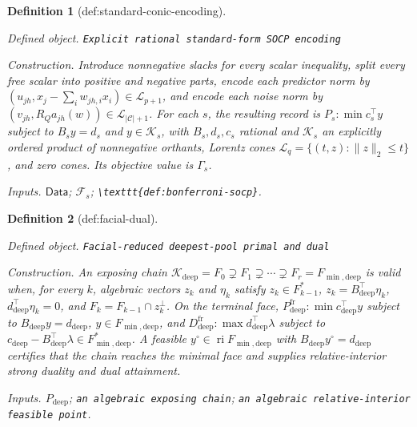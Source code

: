 \documentclass{article}
\newtheorem{definition}{Definition}
\begin{document}
\begin{definition}[def:standard-conic-encoding]\label{def:standard-conic-encoding}
\par\smallskip\noindent\emph{Defined object.} \texttt{Explicit rational standard-\allowbreak{}form SOCP encoding}
\par\smallskip\noindent\emph{Construction.} Introduce nonnegative slacks for every scalar inequality, split every free scalar into positive and negative parts, encode each predictor norm by \((u_{jh},x_j-\sum_iw_{jh,i}x_i)\in\mathcal L_{p+1}\), and encode each noise norm by \((v_{jh},R_Qa_{jh}(w))\in\mathcal L_{|\mathcal C|+1}\). For each \(s\), the resulting record is \(P_s:\min c_s^{\top}y\) subject to \(B_sy=d_s\) and \(y\in\mathcal K_s\), with \(B_s,d_s,c_s\) rational and \(\mathcal K_s\) an explicitly ordered product of nonnegative orthants, Lorentz cones \(\mathcal L_q=\{(t,z):\lVert z\rVert_2\le t\}\), and zero cones. Its objective value is \(\Gamma_s\).
\par\smallskip\noindent\emph{Inputs.} \(\mathsf{Data}\); \(\mathcal F_s\); \texttt{\textbackslash{}\allowbreak{}texttt\{def:\allowbreak{}bonferroni-\allowbreak{}socp\}\allowbreak{}}.
\end{definition}

\begin{definition}[def:facial-dual]\label{def:facial-dual}
\par\smallskip\noindent\emph{Defined object.} \texttt{Facial-\allowbreak{}reduced deepest-\allowbreak{}pool primal and dual}
\par\smallskip\noindent\emph{Construction.} An exposing chain \(\mathcal K_{\mathrm{deep}}=F_0\supsetneq F_1\supsetneq\cdots\supsetneq F_r=F_{\min,\mathrm{deep}}\) is valid when, for every \(k\), algebraic vectors \(z_k\) and \(\eta_k\) satisfy \(z_k\in F_{k-1}^*\), \(z_k=B_{\mathrm{deep}}^{\top}\eta_k\), \(d_{\mathrm{deep}}^{\top}\eta_k=0\), and \(F_k=F_{k-1}\cap z_k^\perp\). On the terminal face, \(P^{\mathrm{fr}}_{\mathrm{deep}}:\min c_{\mathrm{deep}}^{\top}y\) subject to \(B_{\mathrm{deep}}y=d_{\mathrm{deep}}\), \(y\in F_{\min,\mathrm{deep}}\), and \(D^{\mathrm{fr}}_{\mathrm{deep}}:\max d_{\mathrm{deep}}^{\top}\lambda\) subject to \(c_{\mathrm{deep}}-B_{\mathrm{deep}}^{\top}\lambda\in F_{\min,\mathrm{deep}}^*\). A feasible \(y^\circ\in\operatorname{ri}F_{\min,\mathrm{deep}}\) with \(B_{\mathrm{deep}}y^\circ=d_{\mathrm{deep}}\) certifies that the chain reaches the minimal face and supplies relative-interior strong duality and dual attainment.
\par\smallskip\noindent\emph{Inputs.} \(P_{\mathrm{deep}}\); \texttt{an algebraic exposing chain}; \texttt{an algebraic relative-\allowbreak{}interior feasible point}.
\end{definition}
\end{document}
